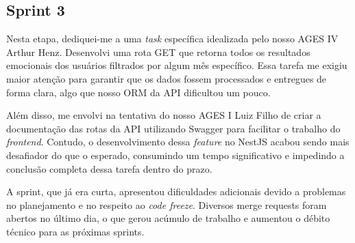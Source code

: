 \subsection{Sprint 3}
Nesta etapa, dediquei-me a uma \textit{task} específica idealizada pelo nosso AGES IV Arthur Henz. Desenvolvi uma rota GET que retorna
todos os resultados emocionais dos usuários filtrados por algum mês específico. Essa tarefa me exigiu maior atenção para garantir que
os dados fossem processados e entregues de forma clara, algo que nosso ORM da API dificultou um pouco.

Além disso, me envolvi na tentativa do nosso AGES I Luiz Filho de criar a documentação das rotas da API utilizando Swagger \cite{swagger-docs}
para facilitar o trabalho do \textit{frontend}. Contudo, o desenvolvimento dessa \textit{feature} no NestJS acabou sendo mais
desafiador do que o esperado, consumindo um tempo significativo e impedindo a conclusão completa
dessa tarefa dentro do prazo.

A sprint, que já era curta, apresentou dificuldades adicionais devido a problemas no planejamento
e no respeito ao \textit{code freeze}. Diversos merge requests foram abertos no último dia, o que gerou acúmulo
de trabalho e aumentou o débito técnico para as próximas sprints.
\\
\\
\noindent{}